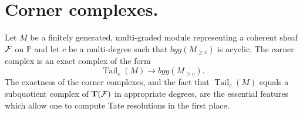 \documentclass[twoside,12pt, leqno]{amsart}
\def\PP{{\mathbb P}}
\def\P{{\mathbb P}}
\def\bT{{\bf T}}
\begin{document}
%
%
%

\section{Corner complexes.}\label{sec:cornercomplex}
Let $M$ be a finitely generated, multi-graded module representing a coherent sheaf ${\mathcal F}$ on $\PP$ and let $c$ be a multi-degree such that $ bgg(M_{\geq c})$ is acyclic.  
The corner complex is an exact complex of the form
\[
\operatorname{Tail}_c(M) \to bgg(M_{\geq c}).
\]
The exactness of the corner complexes, and the fact that $\operatorname{Tail}_c(M)$ equals a subquotient complex of $\bT(\sF)$ in appropriate degrees, are the essential features which allow one to compute Tate resolutions in the first place.  
\end{document}
